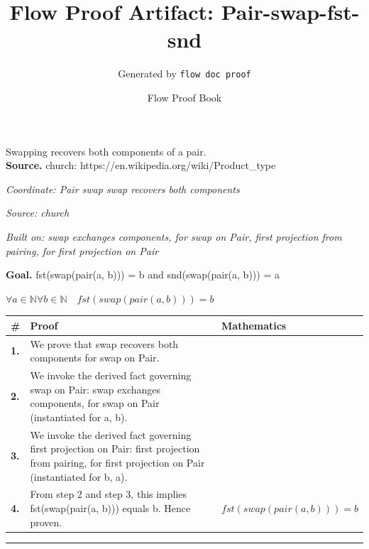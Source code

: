 \documentclass[11pt]{article}
\title{Flow Proof Artifact: Pair-swap-fst-snd}
\author{Generated by \texttt{flow doc proof}}
\date{Flow Proof Book}
\theoremstyle{definition}
\begin{document}
\maketitle
Swapping recovers both components of a pair.\\[0.5em]
\textbf{Source.} church: https://en.wikipedia.org/wiki/Product\_type\\[0.5em]
\bigskip
{}\par
\smallskip\noindent\textit{Coordinate: Pair \cdot swap \cdot swap recovers both components}\par
\smallskip\noindent\textit{Source: church}\par
\smallskip\noindent\textit{Built on: swap exchanges components, for swap on Pair, first projection from pairing, for first projection on Pair}\par
\medskip
\noindent\textbf{Goal.} fst(swap(pair(a, b))) = b and snd(swap(pair(a, b))) = a\par
\noindent$\displaystyle \forall a \in \mathbb{N} \forall b \in \mathbb{N}\quad fst(swap(pair(a, b))) = b$\par
\medskip
\noindent
\begin{tabular}{@{} >{\raggedright\arraybackslash}p{} >{\raggedright\arraybackslash}p{} >{\raggedleft\arraybackslash}p{} @{}}
\textbf{\#} & \textbf{Proof} & \textbf{Mathematics} \\
\midrule
\textbf{1.} & We prove that swap recovers both components for swap on Pair. & \\[0.45em]
\textbf{2.} & We invoke the derived fact governing swap on Pair: swap exchanges components, for swap on Pair (instantiated for a, b). & \\[0.45em]
\textbf{3.} & We invoke the derived fact governing first projection on Pair: first projection from pairing, for first projection on Pair (instantiated for b, a). & \\[0.45em]
\textbf{4.} & From step 2 and step 3, this implies fst(swap(pair(a, b))) equals b. Hence proven. & $\displaystyle fst(swap(pair(a, b))) = b$ \\[0.45em]
\bottomrule
\end{tabular}
\label{thm:Pair-swap-swap_recovers_both_components}
\par\medskip\hrule
\end{document}
